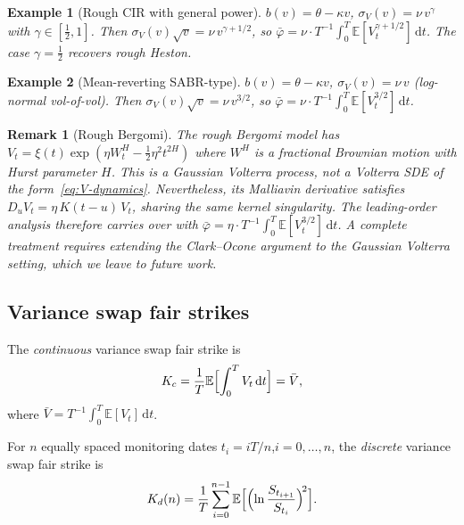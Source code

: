 \documentclass[12pt]{article}
\newtheorem{remark}{Remark}
\newtheorem{example}{Example}
\theoremstyle{definition}
\newcommand{\E}{\mathbb{E}}
\newcommand{\dd}{\mathrm{d}}
\begin{document}
\begin{example}[Rough CIR with general power]\label{ex:rough-cir}
$b(v) = \theta - \kappa v$,
$\sigma_V(v) = \nu\, v^\gamma$ with $\gamma \in [\tfrac12, 1]$.
Then $\sigma_V(v)\sqrt{v} = \nu\, v^{\gamma+1/2}$, so
$\bar\varphi = \nu\cdot T^{-1}\!\int_0^T\!\E[V_t^{\gamma+1/2}]\,\dd t$.
The case $\gamma = \tfrac12$ recovers rough Heston.
\end{example}

\begin{example}[Mean-reverting SABR-type]\label{ex:sabr}
$b(v) = \theta - \kappa v$, $\sigma_V(v) = \nu\, v$ (log-normal
vol-of-vol). Then $\sigma_V(v)\sqrt{v} = \nu\, v^{3/2}$, so
$\bar\varphi = \nu\cdot T^{-1}\!\int_0^T\!\E[V_t^{3/2}]\,\dd t$.
\end{example}

\begin{remark}[Rough Bergomi]\label{rem:rough-bergomi}
The rough Bergomi model \citep{BayerFrizGatheral2016} has
$V_t = \xi(t)\exp(\eta W^H_t - \tfrac12\eta^2 t^{2H})$
where $W^H$ is a fractional Brownian motion with Hurst parameter $H$.
This is a Gaussian Volterra process, \emph{not} a Volterra SDE of the
form~\eqref{eq:V-dynamics}. Nevertheless, its Malliavin derivative
satisfies $D_u V_t = \eta\, K(t{-}u)\, V_t$, sharing the same
kernel singularity. The leading-order analysis therefore carries over
with $\bar\varphi = \eta\cdot T^{-1}\!\int_0^T\!\E[V_t^{3/2}]\,\dd t$.
A complete treatment requires extending the Clark--Ocone argument
to the Gaussian Volterra setting, which we leave to future work.
\end{remark}

\subsection{Variance swap fair strikes}\label{sec:vs-strikes}

The \emph{continuous} variance swap fair strike is
\begin{equation}\label{eq:Kc}
  K_c = \frac{1}{T}\E\Bigl[\int_0^T V_t\,\dd t\Bigr]
  = \bar V,
\end{equation}
where $\bar V = T^{-1}\int_0^T \E[V_t]\,\dd t$.

For $n$ equally spaced monitoring dates $t_i = iT/n$,\;$i = 0,\ldots,n$,
the \emph{discrete} variance swap fair strike is
\begin{equation}\label{eq:Kd}
  K_d(n) = \frac{1}{T}\sum_{i=0}^{n-1}
  \E\Bigl[\Bigl(\ln\frac{S_{t_{i+1}}}{S_{t_i}}\Bigr)^{\!2}\Bigr].
\end{equation}
\end{document}
